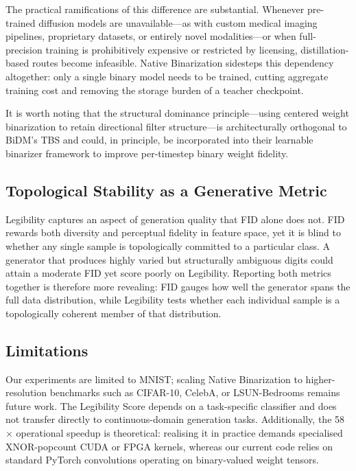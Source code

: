 \documentclass[conference]{IEEEtran}
\begin{document}
The practical ramifications of this difference are substantial. Whenever pre-trained
diffusion models are unavailable---as with custom medical imaging pipelines, proprietary
datasets, or entirely novel modalities---or when full-precision training is prohibitively
expensive or restricted by licensing, distillation-based routes become infeasible. Native
Binarization sidesteps this dependency altogether: only a single binary model needs to be
trained, cutting aggregate training cost and removing the storage burden of a teacher
checkpoint.

It is worth noting that the structural dominance principle---using centered weight
binarization to retain directional filter structure---is architecturally orthogonal to
BiDM's TBS and could, in principle, be incorporated into their learnable binarizer
framework to improve per-timestep binary weight fidelity.

\subsection{Topological Stability as a Generative Metric}

Legibility captures an aspect of generation quality that FID alone does not. FID rewards
both diversity and perceptual fidelity in feature space, yet it is blind to whether any
single sample is topologically committed to a particular class. A generator that produces
highly varied but structurally ambiguous digits could attain a moderate FID yet score
poorly on Legibility. Reporting both metrics together is therefore more revealing: FID
gauges how well the generator spans the full data distribution, while Legibility tests
whether each individual sample is a topologically coherent member of that distribution.

\subsection{Limitations}

Our experiments are limited to MNIST; scaling Native Binarization to higher-resolution
benchmarks such as CIFAR-10, CelebA, or LSUN-Bedrooms remains future work. The
Legibility Score depends on a task-specific classifier and does not transfer directly to
continuous-domain generation tasks. Additionally, the 58$\times$ operational speedup is
theoretical: realising it in practice demands specialised XNOR-popcount CUDA or FPGA
kernels, whereas our current code relies on standard PyTorch convolutions operating on
binary-valued weight tensors.
\end{document}

